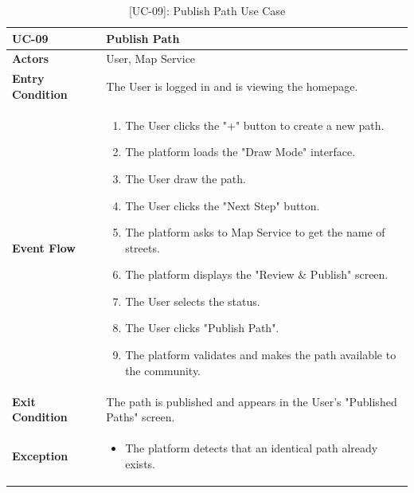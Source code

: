 \begin{table}[H]
    \centering
    \setlength\extrarowheight{2pt}
    \renewcommand{\arraystretch}{1.2}
    \begin{tabularx}{\textwidth}{|>{\bfseries}l|X|}
    \hline
    UC-09 & Publish Path\\ \hline
    Actors & User, Map Service\\ \hline
    Entry Condition & The User is logged in and is viewing the homepage.\\ \hline
    Event Flow & 
    \begin{enumerate}
      \item The User clicks the "+" button to create a new path.
      \item The platform loads the "Draw Mode" interface.
      \item The User draw the path.
      \item The User clicks the "Next Step" button.
      \item The platform asks to Map Service to get the name of streets.
      \item The platform displays the "Review \& Publish" screen.
      \item The User selects the status.
      \item The User clicks "Publish Path".
      \item The platform validates and makes the path available to the community.
    \end{enumerate}
    \\ \hline
    Exit Condition &  The path is published and appears in the User's "Published Paths" screen.\\ \hline
    Exception &
    \begin{itemize}
        \item  The platform detects that an identical path already exists.
    \end{itemize}
    \\ \hline
   \end{tabularx}
    \label{UC-09}
     \caption{[UC-09]: Publish Path Use Case}
\end{table}

